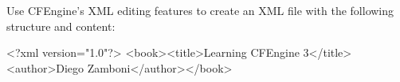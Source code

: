\begin{aside}
\label{aside:exercise_26}

Use CFEngine's XML editing features to create an XML file with the following structure and content:

\begin{code}
<?xml version="1.0"?>
<book><title>Learning CFEngine 3</title><author>Diego Zamboni</author></book>
\end{code}

\end{aside}